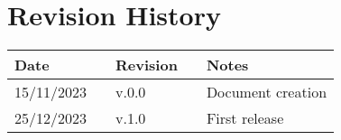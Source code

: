 \chapter*{Revision History}

\begin{table}[h]
    \centering
    \begin{tabular}{l p{2.5cm} l p{2.5cm} l}
        \hline
        \textbf{Date} &  & \textbf{Revision} &  & \textbf{Notes}    \\ \hline
        15/11/2023    &  & v.0.0             &  & Document creation \\
        25/12/2023    &  & v.1.0             &  & First release      \\ \hline
    \end{tabular}
\end{table}

\newpage